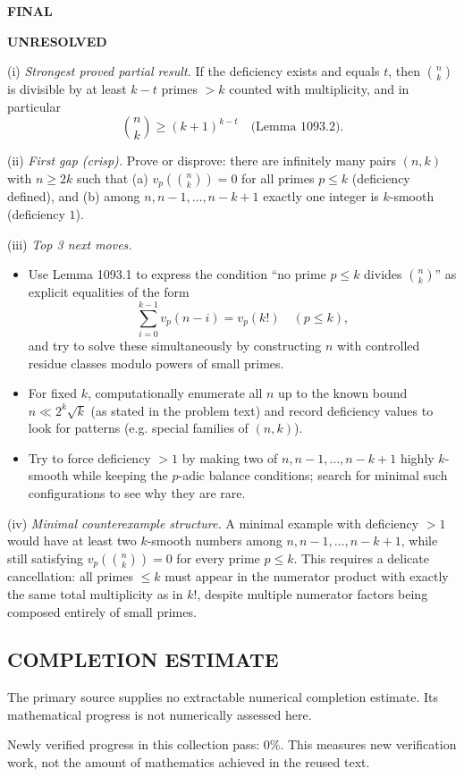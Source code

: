\textbf{FINAL}

\textbf{UNRESOLVED}

(i) \emph{Strongest proved partial result.} If the deficiency exists and equals $t$, then $\binom{n}{k}$ is divisible by at least $k-t$ primes $>k$ counted with multiplicity, and in particular
\[\binom{n}{k}\ge (k+1)^{k-t}\quad\text{(Lemma 1093.2).}
\]

(ii) \emph{First gap (crisp).} Prove or disprove: there are infinitely many pairs $(n,k)$ with $n\ge 2k$ such that
(a) $v_p\!\left(\binom{n}{k}\right)=0$ for all primes $p\le k$ (deficiency defined), and
(b) among $n,n-1,\dots,n-k+1$ exactly one integer is $k$-smooth (deficiency $1$).

(iii) \emph{Top 3 next moves.}
\begin{itemize}
\item Use Lemma 1093.1 to express the condition ``no prime $p\le k$ divides $\binom{n}{k}$'' as explicit equalities of the form
\[\sum_{i=0}^{k-1} v_p(n-i)=v_p(k!)\quad (p\le k),
\]
and try to solve these simultaneously by constructing $n$ with controlled residue classes modulo powers of small primes.
\item For fixed $k$, computationally enumerate all $n$ up to the known bound $n\ll 2^k\sqrt{k}$ (as stated in the problem text) and record deficiency values to look for patterns (e.g. special families of $(n,k)$).
\item Try to force deficiency $>1$ by making two of $n,n-1,\dots,n-k+1$ highly $k$-smooth while keeping the $p$-adic balance conditions; search for minimal such configurations to see why they are rare.
\end{itemize}

(iv) \emph{Minimal counterexample structure.} A minimal example with deficiency $>1$ would have at least two $k$-smooth numbers among $n,n-1,\dots,n-k+1$, while still satisfying $v_p\!\left(\binom{n}{k}\right)=0$ for every prime $p\le k$. This requires a delicate cancellation: all primes $\le k$ must appear in the numerator product with exactly the same total multiplicity as in $k!$, despite multiple numerator factors being composed entirely of small primes.


\subsection*{COMPLETION ESTIMATE}
The primary source supplies no extractable numerical completion estimate. Its mathematical progress is not numerically assessed here.

Newly verified progress in this collection pass: $0\%$. This measures new verification work, not the amount of mathematics achieved in the reused text.
